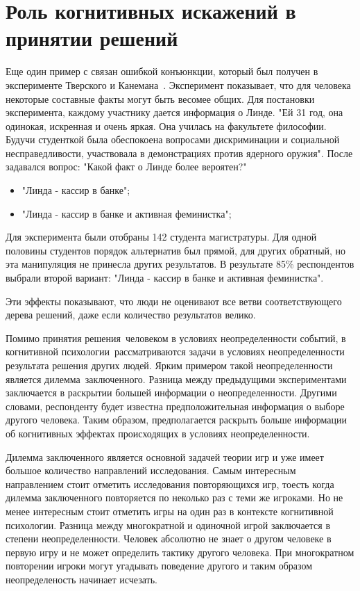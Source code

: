 \section{Роль когнитивных искажений в принятии решений}

Еще один пример с связан ошибкой конъюнкции, который был получен в эксперименте Тверского и
Канемана~\citep{tversky1983extensional}. Эксперимент показывает, что для человека некоторые составные
факты могут быть весомее общих. Для постановки эксперимента, каждому участнику дается информация о
Линде. "Ей 31 год, она одинокая, искренная и очень яркая. Она училась на факультете философии.
Будучи студенткой была обеспокоена вопросами дискриминации и социальной несправедливости, участвовала
в демонстрациях против ядерного оружия". После задавался вопрос: "Какой факт о Линде более вероятен?"
\begin{itemize}
    \item "Линда - кассир в банке";
    \item "Линда - кассир в банке и активная феминистка";
\end{itemize}
Для эксперимента были отобраны 142 студента магистратуры. Для одной половины студентов порядок альтернатив
был прямой, для других обратный, но эта манипуляция не принесла других результатов. В результате 85\%
респондентов выбрали второй вариант: "Линда - кассир в банке и активная феминистка"\citep{tversky2004extensional}.

Эти эффекты показывают, что люди не оценивают все ветви соответствующего дерева решений, даже если
количество результатов велико.

Помимо принятия решения~человеком в условиях неопределенности событий, в когнитивной психологии~рассматриваются
задачи в условиях неопределенности результата решения других людей. Ярким примером такой неопределенности
является дилемма~заключенного. Разница между предыдущими экспериментами заключается в раскрытии большей
информации о неопределенности. Другими словами, респонденту будет известна предположительная информация
о выборе другого человека. Таким образом, предполагается раскрыть больше информации об когнитивных эффектах
происходящих в условиях неопределенности.

Дилемма заключенного является основной задачей теории игр и уже имеет большое количество направлений
исследования. Самым интересным направлением стоит отметить исследования повторяющихся игр, тоесть когда
дилемма заключенного повторяется по неколько раз с теми же игроками. Но не менее интересным стоит
отметить игры на один раз в контексте когнитивной психологии. Разница между многократной и одиночной
игрой заключается в степени неопределенности. Человек абсолютно не знает о другом человеке в первую игру и
не может определить тактику другого человека. При многократном повторении игроки могут угадывать
поведение другого и таким образом неопределеность начинает исчезать.

